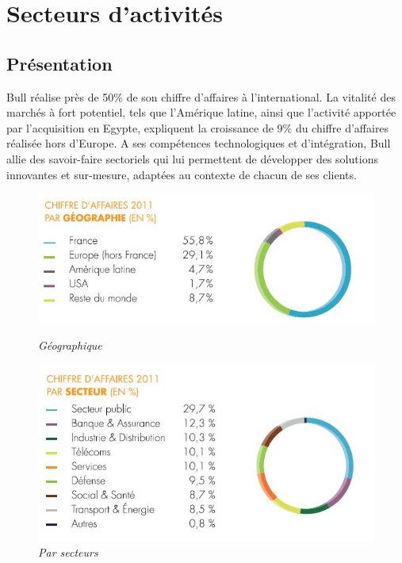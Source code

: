 \documentclass[11pt]{article}
\begin{document}
	\section{Secteurs d'activités}
		\subsection{Présentation}
		Bull réalise près de 50\% de son chiffre d'affaires à l'international. La vitalité des marchés à fort potentiel, tels 
		que l'Amérique latine, ainsi que l'activité apportée par l'acquisition en Egypte, expliquent la croissance de 9\% du chiffre 
		d'affaires réalisée hors d'Europe. \newline
		A ses compétences technologiques et d'intégration, Bull allie des savoir-faire sectoriels qui lui permettent de développer 
		des solutions innovantes et sur-mesure, adaptées au contexte de chacun de ses clients.
		\begin{figure}[h!]
		\begin{minipage}[b]{0.5\linewidth}
		\centering \includegraphics[scale=0.5]{profil2012_ca_repartition_fr.jpg}
		\caption{\it Géographique}
		\end{minipage}\hfill
		\begin{minipage}[b]{0.5\linewidth}
		\centering \includegraphics[scale=0.5]{profil2012_ca_repartitionsecteur_fr.jpg}
		\caption{\it Par secteurs}
		\end{minipage}
		\end{figure}
\end{document}
